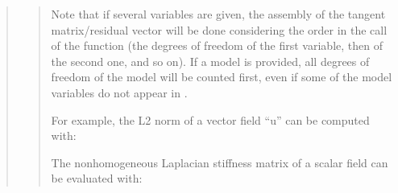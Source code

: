 \documentclass[a4paper,11pt,english]{sphinxmanual}
\begin{document}
\begin{quote}
\begin{quote}
Note that if several variables are given, the assembly of the
tangent matrix/residual vector will be done considering the order
in the call of the function (the degrees of freedom of the first
variable, then of the second one, and so on). If a model is provided,
all degrees of freedom of the model will be counted first, even if
some of the model variables do not appear in .

For example, the L2 norm of a vector field “u” can be computed with:

\begin{sphinxVerbatim}[commandchars=\\\{\}]
      

        
\end{sphinxVerbatim}

The nonhomogeneous Laplacian stiffness matrix of a scalar field can be evaluated with:

\begin{sphinxVerbatim}[commandchars=\\\{\}]
       

            
\end{sphinxVerbatim}
\end{quote}


\end{quote}
\end{document}
